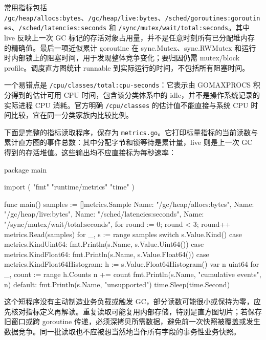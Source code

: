 \documentclass[UTF8,fontset=fandol,openany,11pt]{ctexbook}
\begin{document}
常用指标包括 \texttt{/\allowbreak{}gc/\allowbreak{}heap/\allowbreak{}allocs:\allowbreak{}bytes}、\texttt{/\allowbreak{}gc/\allowbreak{}heap/\allowbreak{}live:\allowbreak{}bytes}、\texttt{/\allowbreak{}sched/\allowbreak{}goroutines:\allowbreak{}goroutines}、\texttt{/\allowbreak{}sched/\allowbreak{}latencies:\allowbreak{}seconds} 和 \texttt{/\allowbreak{}sync/\allowbreak{}mutex/\allowbreak{}wait/\allowbreak{}total:\allowbreak{}seconds}。其中 live 反映上一次 GC 标记的存活对象占用量，并不是任意时刻所有已分配堆内存的精确值。最后一项近似累计 goroutine 在 sync.Mutex、sync.RWMutex 和运行时内部锁上的阻塞时间，用于发现整体竞争变化；要归因仍需 mutex/block profile。调度直方图统计 runnable 到实际运行的时间，不包括所有阻塞时间。

一个易错点是 \texttt{/\allowbreak{}cpu/\allowbreak{}classes/\allowbreak{}total:\allowbreak{}cpu-\allowbreak{}seconds}：它表示由 GOMAXPROCS 积分得到的估计可用 CPU 时间，包含该分类体系中的 idle，并不是操作系统记录的实际进程 CPU 消耗。官方明确 \texttt{/\allowbreak{}cpu/\allowbreak{}classes} 的估计值不能直接与系统 CPU 时间比较，宜在同一分类家族内比较比例。\cite{tools-metrics}

下面是完整的指标读取程序，保存为 \texttt{metrics.\allowbreak{}go}。它打印标量指标的当前读数与累计直方图的事件总数：其中分配字节和锁等待是累计量，live 则是上一次 GC 得到的存活堆值。这些输出均不应直接标为每秒速率：

\begin{codeblock}
package main

import (
	"fmt"
	"runtime/metrics"
	"time"
)

func main() {
	samples := []metrics.Sample{
		{Name: "/gc/heap/allocs:bytes"},
		{Name: "/gc/heap/live:bytes"},
		{Name: "/sched/latencies:seconds"},
		{Name: "/sync/mutex/wait/total:seconds"},
	}
	for round := 0; round < 3; round++ {
		metrics.Read(samples)
		for _, s := range samples {
			switch s.Value.Kind() {
			case metrics.KindUint64:
				fmt.Println(s.Name, s.Value.Uint64())
			case metrics.KindFloat64:
				fmt.Println(s.Name, s.Value.Float64())
			case metrics.KindFloat64Histogram:
				h := s.Value.Float64Histogram()
				var n uint64
				for _, count := range h.Counts {
					n += count
				}
				fmt.Println(s.Name, "cumulative events", n)
			default:
				fmt.Println(s.Name, "unsupported")
			}
		}
		time.Sleep(time.Second)
	}
}
\end{codeblock}

这个短程序没有主动制造业务负载或触发 GC，部分读数可能很小或保持为零，应先核对指标定义再解读。重复读取可能复用内部存储，特别是直方图切片；若保存旧窗口或跨 goroutine 传递，必须深拷贝所需数据，避免前一次快照被覆盖或发生数据竞争。同一批读取也不应被想当然地当作所有字段的事务性业务快照。\cite{tools-metrics-read}
\end{document}

